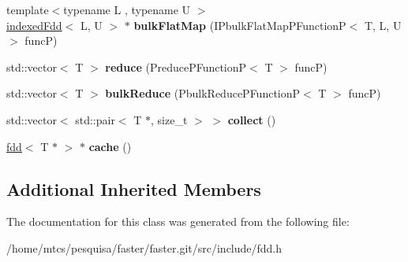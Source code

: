 \begin{DoxyCompactItemize}
\hypertarget{classfaster_1_1fdd_3_01T_01_5_01_4_a9215f59e778be75025275ee5954beacb}{}\label{classfaster_1_1fdd_3_01T_01_5_01_4_a9215f59e778be75025275ee5954beacb} 
{\footnotesize template$<$typename L , typename U $>$ }\\\hyperlink{classfaster_1_1indexedFdd}{indexed\+Fdd}$<$ L, U $>$ $\ast$ {\bfseries bulk\+Flat\+Map} (I\+Pbulk\+Flat\+Map\+P\+FunctionP$<$ T, L, U $>$ funcP)
\item 
\hypertarget{classfaster_1_1fdd_3_01T_01_5_01_4_a14f17acd4d8412255e0b075d51f04a3f}{}\label{classfaster_1_1fdd_3_01T_01_5_01_4_a14f17acd4d8412255e0b075d51f04a3f} 
std\+::vector$<$ T $>$ {\bfseries reduce} (Preduce\+P\+FunctionP$<$ T $>$ funcP)
\item 
\hypertarget{classfaster_1_1fdd_3_01T_01_5_01_4_a95830370065eb3bd41ea93b7843199be}{}\label{classfaster_1_1fdd_3_01T_01_5_01_4_a95830370065eb3bd41ea93b7843199be} 
std\+::vector$<$ T $>$ {\bfseries bulk\+Reduce} (Pbulk\+Reduce\+P\+FunctionP$<$ T $>$ funcP)
\item 
\hypertarget{classfaster_1_1fdd_3_01T_01_5_01_4_aa2e17d79b0f34c2722f9502b8ca56d29}{}\label{classfaster_1_1fdd_3_01T_01_5_01_4_aa2e17d79b0f34c2722f9502b8ca56d29} 
std\+::vector$<$ std\+::pair$<$ T $\ast$, size\+\_\+t $>$ $>$ {\bfseries collect} ()
\item 
\hypertarget{classfaster_1_1fdd_3_01T_01_5_01_4_a819ca1aeeee4808b7c19a7d30d3be249}{}\label{classfaster_1_1fdd_3_01T_01_5_01_4_a819ca1aeeee4808b7c19a7d30d3be249} 
\hyperlink{classfaster_1_1fdd}{fdd}$<$ T $\ast$ $>$ $\ast$ {\bfseries cache} ()
\end{DoxyCompactItemize}
\subsection*{Additional Inherited Members}


The documentation for this class was generated from the following file\+:\begin{DoxyCompactItemize}
\item 
/home/mtcs/pesquisa/faster/faster.\+git/src/include/fdd.\+h\end{DoxyCompactItemize}
